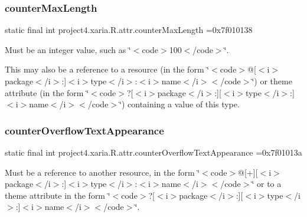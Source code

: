 \subsubsection{\texorpdfstring{counter\+Max\+Length}{counterMaxLength}}
{\footnotesize\ttfamily static final int project4.\+xaria.\+R.\+attr.\+counter\+Max\+Length =0x7f010138\hspace{0.3cm}{\ttfamily [static]}}

Must be an integer value, such as \char`\"{}$<$code$>$100$<$/code$>$\char`\"{}. 

This may also be a reference to a resource (in the form \char`\"{}$<$code$>$@\mbox{[}$<$i$>$package$<$/i$>$\+:\mbox{]}$<$i$>$type$<$/i$>$\+:$<$i$>$name$<$/i$>$$<$/code$>$\char`\"{}) or theme attribute (in the form \char`\"{}$<$code$>$?\mbox{[}$<$i$>$package$<$/i$>$\+:\mbox{]}\mbox{[}$<$i$>$type$<$/i$>$\+:\mbox{]}$<$i$>$name$<$/i$>$$<$/code$>$\char`\"{}) containing a value of this type. \mbox{\label{classproject4_1_1xaria_1_1R_1_1attr_a11aecbe2c472f65bb1ae18a701957a0b}} 
\subsubsection{\texorpdfstring{counter\+Overflow\+Text\+Appearance}{counterOverflowTextAppearance}}
{\footnotesize\ttfamily static final int project4.\+xaria.\+R.\+attr.\+counter\+Overflow\+Text\+Appearance =0x7f01013a\hspace{0.3cm}{\ttfamily [static]}}

Must be a reference to another resource, in the form \char`\"{}$<$code$>$@\mbox{[}+\mbox{]}\mbox{[}$<$i$>$package$<$/i$>$\+:\mbox{]}$<$i$>$type$<$/i$>$\+:$<$i$>$name$<$/i$>$$<$/code$>$\char`\"{} or to a theme attribute in the form \char`\"{}$<$code$>$?\mbox{[}$<$i$>$package$<$/i$>$\+:\mbox{]}\mbox{[}$<$i$>$type$<$/i$>$\+:\mbox{]}$<$i$>$name$<$/i$>$$<$/code$>$\char`\"{}. \mbox{\label{classproject4_1_1xaria_1_1R_1_1attr_a641e752b5c342130e39a03b41a5c8d5f}} 
